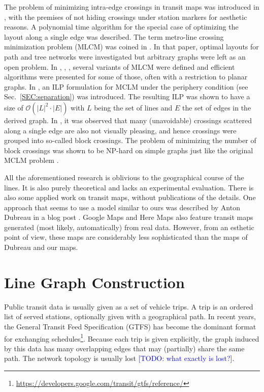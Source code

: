 \documentclass{llncs}
\newcommand\TODO[1]{\textcolor{blue}{\small [TODO: #1]}}
\begin{document}
The problem of minimizing intra-edge crossings in transit maps was introduced in \cite{ben06},
with the premises of not hiding crossings under station markers for aesthetic reasons.
A polynomial time algorithm for the special case of optimizing the layout along a single edge was described.
The term metro-line crossing minimization problem (MLCM) was coined in \cite{bek07}.
In that paper, optimal layouts for path and tree networks were investigated but arbitrary graphs were left as an open problem.
In \cite{arg08}, \cite{nol09}, \cite{arg10}, several variants of MLCM were defined and efficient algorithms were presented for some of those, often with a restriction to planar graphs.
In \cite{asq08}, an ILP formulation for MCLM under the periphery condition (see Sec.~\ref{SEC:separation}) was introduced.
The resulting ILP was shown to have a size of $\mathcal{O}(|L|^2 \cdot |E|)$ with $L$ being the set of lines and $E$ the set of edges in the derived graph.
In \cite{fin13b}, it was observed that many (unavoidable) crossings scattered along a single edge are also not visually pleasing,
and hence crossings were grouped into so-called block crossings.
The problem of minimizing the number of block crossings was shown to be NP-hard on simple graphs just like the original MCLM problem \cite{fin13a}.

All the aforementioned research is oblivious to the geographical course of the lines.
It is also purely theoretical and lacks an experimental evaluation.
There is also some applied work on transit maps, without publications of the details.
One approach that seems to use a model similar to ours was described by Anton Dubreau in a blog post \cite{dub16}.
Google Maps and Here Maps also feature transit maps generated (most likely, automatically) from real data.
However, from an esthetic point of view, these maps are considerably less sophisticated than the maps of Dubreau and our maps.


%
\section{Line Graph Construction}\label{SEC:graph}
%

Public transit data is usually given as a set of vehicle trips. A trip is an ordered list of served stations, optionally given with a geographical path. In recent years, the General Transit Feed Specification (GTFS) has become the dominant format for exchanging schedules\footnote{\url{https://developers.google.com/transit/gtfs/reference/}}. Because each trip is given explicitly, the graph induced by this data has many overlapping edges that may (partially) share the same path. The network topology is usually lost \TODO{what exactly is lost?}.
\end{document}
